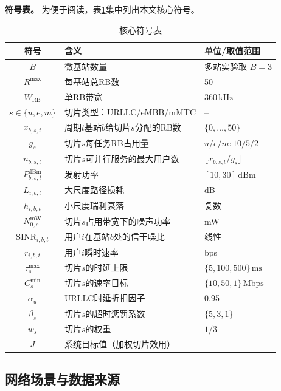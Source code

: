 \documentclass[UTF8,a4paper,12pt,fontset=fandol]{ctexart}
\begin{document}
\noindent\textbf{符号表。} 为便于阅读，表\ref{tab:notation}集中列出本文核心符号。

\begin{table}[htbp]
  \centering
  \caption{核心符号表}
  \label{tab:notation}
  \small
  \begin{tabular}{cll}
    \toprule
    符号 & 含义 & 单位/取值范围 \\
    \midrule
    $B$ & 微基站数量 & 多站实验取 $B=3$ \\
    $R^{\max}$ & 每基站总RB数 & 50 \\
    $W_{\text{RB}}$ & 单RB带宽 & $360\,\mathrm{kHz}$ \\
    $s\in\{u,e,m\}$ & 切片类型：URLLC/eMBB/mMTC & -- \\
    $x_{b,s,t}$ & 周期$t$基站$b$给切片$s$分配的RB数 & $\{0,\dots,50\}$ \\
    $g_s$ & 切片$s$每任务RB占用量 & $u/e/m:10/5/2$ \\
    $n_{b,s,t}$ & 切片$s$可并行服务的最大用户数 & $\lfloor x_{b,s,t}/g_s\rfloor$ \\
    $P_{b,s,t}^{\text{dBm}}$ & 发射功率 & $[10,30]\,\mathrm{dBm}$ \\
    $L_{i,b,t}$ & 大尺度路径损耗 & dB \\
    $h_{i,b,t}$ & 小尺度瑞利衰落 & 复数 \\
    $N_{0,s}^{\mathrm{mW}}$ & 切片$s$占用带宽下的噪声功率 & mW \\
    $\mathrm{SINR}_{i,b,t}$ & 用户$i$在基站$b$处的信干噪比 & 线性 \\
    $r_{i,b,t}$ & 用户$i$瞬时速率 & bps \\
    $\tau_s^{\max}$ & 切片$s$的时延上限 & $\{5,100,500\}\,\mathrm{ms}$ \\
    $C_s^{\min}$ & 切片$s$的速率目标 & $\{10,50,1\}\,\mathrm{Mbps}$ \\
    $\alpha_u$ & URLLC时延折扣因子 & 0.95 \\
    $\beta_s$ & 切片$s$的超时惩罚系数 & $\{5,3,1\}$ \\
    $w_s$ & 切片$s$的权重 & $1/3$ \\
    $J$ & 系统目标值（加权切片效用） & -- \\
    \bottomrule
  \end{tabular}
\end{table}

\subsection{网络场景与数据来源}
\end{document}
